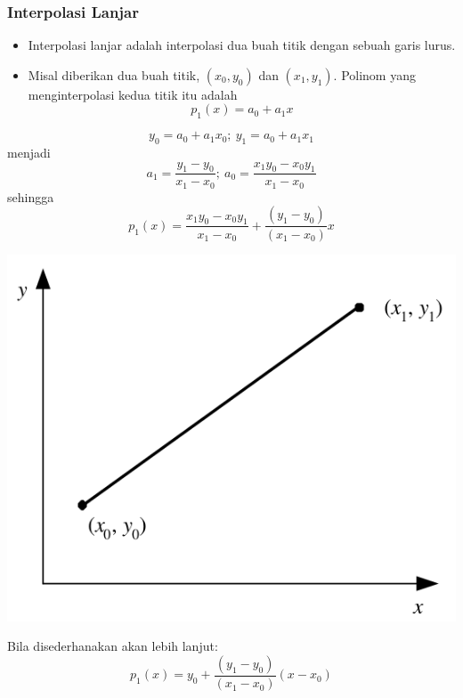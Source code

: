 \documentclass[pdflatex,compress,mathserif]{beamer}
\begin{document}
\begin{frame}
	\frametitle{Interpolasi Lanjar}
	\begin{itemize}
		\item Interpolasi lanjar adalah interpolasi dua buah titik dengan sebuah garis lurus.
		\item Misal diberikan dua buah titik, $ (x_0 , y_0) $ dan $ (x_1, y_1) $. Polinom yang menginterpolasi kedua titik itu adalah \[ p_1 (x) = a_0 + a_1 x \]
	\end{itemize}
	\begin{multicols}{2}
		\[ y_0 = a_0 + a_1 x_0;~y_1 = a_0 + a_1 x_1 \] menjadi
		\[ a_1 = \frac{y_1 - y_0}{x_1 - x_0};~a_0 = \frac{x_1 y_0 - x_0 y_1}{x_1 - x_0} \] sehingga
		\[ p_1(x) = \frac{x_1 y_0 - x_0 y_1}{x_1 - x_0} +  \frac{(y_1 - y_0)}{(x_1 - x_0)} x \]
		\columnbreak
		\begin{center}
			\includegraphics[width=0.8\linewidth]{img/img04}
		\end{center}
	\end{multicols}
\end{frame}

\begin{frame}
	Bila disederhanakan akan lebih lanjut:
	\begin{equation}\label{int.lanj}
		p_1(x) = y_0 + \frac{(y_1 - y_0)}{(x_1 - x_0)}(x-x_0)
	\end{equation}
\end{frame}
\end{document}
